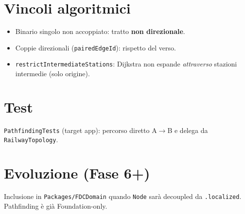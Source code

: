 \section{Vincoli algoritmici}

\begin{itemize}
  \item Binario singolo non accoppiato: tratto \textbf{non direzionale}.
  \item Coppie direzionali (\texttt{pairedEdgeId}): rispetto del verso.
  \item \texttt{restrictIntermediateStations}: Dijkstra non espande \emph{attraverso}
    stazioni intermedie (solo origine).
\end{itemize}

\section{Test}

\texttt{PathfindingTests} (target app): percorso diretto A$\rightarrow$B e
delega da \texttt{RailwayTopology}.

\section{Evoluzione (Fase 6+)}

Inclusione in \texttt{Packages/FDCDomain} quando \texttt{Node} sarà
decoupled da \texttt{.localized}. Pathfinding è già Foundation-only.
